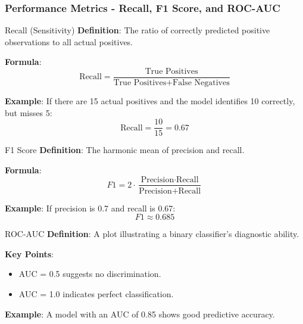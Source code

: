 \documentclass[aspectratio=169]{beamer}
\begin{document}
\begin{frame}[fragile]
    \frametitle{Performance Metrics - Recall, F1 Score, and ROC-AUC}
    \begin{block}{Recall (Sensitivity)}
        \textbf{Definition}: The ratio of correctly predicted positive observations to all actual positives.
        
        \textbf{Formula}:
        \begin{equation}
            \text{Recall} = \frac{\text{True Positives}}{\text{True Positives} + \text{False Negatives}}
        \end{equation}
        
        \textbf{Example}: If there are 15 actual positives and the model identifies 10 correctly, but misses 5:
        \begin{equation}
            \text{Recall} = \frac{10}{15} = 0.67
        \end{equation}
    \end{block}

    \begin{block}{F1 Score}
        \textbf{Definition}: The harmonic mean of precision and recall.
        
        \textbf{Formula}:
        \begin{equation}
            F1 = 2 \cdot \frac{\text{Precision} \cdot \text{Recall}}{\text{Precision} + \text{Recall}}
        \end{equation}
        
        \textbf{Example}: If precision is 0.7 and recall is 0.67:
        \begin{equation}
            F1 \approx 0.685
        \end{equation}
    \end{block}

    \begin{block}{ROC-AUC}
        \textbf{Definition}: A plot illustrating a binary classifier's diagnostic ability.
        
        \textbf{Key Points}: 
        \begin{itemize}
            \item AUC = 0.5 suggests no discrimination.
            \item AUC = 1.0 indicates perfect classification.
        \end{itemize}
        
        \textbf{Example}: A model with an AUC of 0.85 shows good predictive accuracy.
    \end{block}
\end{frame}
\end{document}
